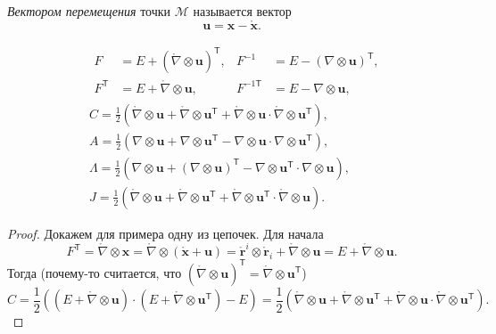 \begin{definition*}
  \emph{Вектором перемещения} точки $ \mathcal M $ называется вектор  
  \[
    \mathbf{u} = \mathbf{x} - \mathring{\mathbf{x}}.
  \]
\end{definition*}

\begin{theorem*}
  \begin{align*}
  &\begin{aligned}
    F &= E + (\mathring{\nabla}\otimes \mathbf{u})^{\mathsf T}, & F^{-1} &= E -
    (\nabla \otimes \mathbf{u})^{\mathsf T},\\
    F^{\mathsf T} &= E + \mathring{\nabla}\otimes \mathbf{u}, & F^{-1\mathsf{T}}
                  &= E - \nabla \otimes \mathbf{u},
  \end{aligned}\\
  &C = \frac{1}{2} ( \mathring{\nabla}\otimes \mathbf{u} +
  \mathring{\nabla}\otimes \mathbf{u}^{\mathsf T} + \mathring{\nabla}\otimes
\mathbf{u} \cdot \mathring{\nabla}\otimes \mathbf{u}^{\mathsf T} ),\\
  &A = \frac{1}{2} (\nabla \otimes \mathbf{u} + \nabla \otimes
  \mathbf{u}^{\mathsf T} - \nabla \otimes \mathbf{u}\cdot \nabla\otimes
  \mathbf{u}^{\mathsf T}),\\
  &\Lambda = \frac{1}{2}(\nabla \otimes \mathbf{u} + (\nabla \otimes
  \mathbf{u})^{\mathsf T} - \nabla \otimes \mathbf{u}^{\mathsf T} \cdot \nabla
  \otimes \mathbf{u}),\\
  &J = \frac{1}{2} ( \mathring{\nabla} \otimes \mathbf{u} + \mathring{\nabla}
  \otimes \mathbf{u}^{\mathsf T} + \mathring{\nabla} \otimes \mathbf{u}^{\mathsf
  T}\cdot \mathring{\nabla}\otimes \mathbf{u}).
\end{align*}
\end{theorem*}
\begin{proof}
  Докажем для примера одну из цепочек. Для начала  
  \[
    F^{\mathsf T} = \mathring{\nabla}\otimes \mathbf{x} =
    \mathring{\nabla}\otimes (\mathring{\mathbf{x}} + \mathbf{u}) =
    \mathring{\mathbf{r}}^i \otimes \mathring{\mathbf{r}}_i +
    \mathring{\nabla}\otimes \mathbf{u} = E + \mathring{\nabla} \otimes
    \mathbf{u}.
  \]
  Тогда (почему-то считается, что $ (\mathring{\nabla}\otimes
  \mathbf{u})^{\mathsf T} = \mathring{\nabla}\otimes \mathbf{u}^{\mathsf T} $)
 \[
   C = \frac{1}{2} ( (E + \mathring{\nabla} \otimes \mathbf{u}) \cdot
   (E+\mathring{\nabla}\otimes \mathbf{u}^{\mathsf T}) - E) = \frac{1}{2}
   (\mathring{\nabla}\otimes \mathbf{u} + \mathring{\nabla}\otimes
   \mathbf{u}^{\mathsf T} + \mathring{\nabla}\otimes \mathbf{u}\cdot
   \mathring{\nabla}\otimes \mathbf{u}^{\mathsf T}).
 \]
\end{proof}

